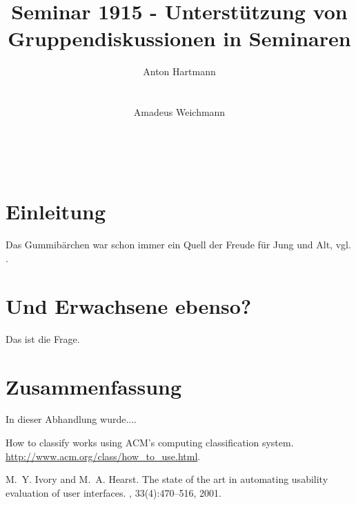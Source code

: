 \documentclass{seminarvorlage}
\begin{document}
\title{Seminar 1915 - Unterstützung von Gruppendiskussionen in Seminaren}
\author{
  \alignauthor Anton Hartmann\\
    \\
    \\
  \alignauthor Amadeus Weichmann\\
    \\
    \\
    \\
}

\maketitle



\section{Einleitung}

Das Gummibärchen war schon immer ein Quell der Freude für Jung
und Alt, vgl. \cite{acmcategories,Ivory2001}.

\section{Und Erwachsene ebenso?}

Das ist die Frage.

\section{Zusammenfassung}
In dieser Abhandlung wurde....


\begin{thebibliography}{9}
How to classify works using ACM's computing classification system.
\newblock \url{http://www.acm.org/class/how_to_use.html}.

M.~Y. Ivory and M.~A. Hearst.
\newblock The state of the art in automating usability evaluation of user
  interfaces.
, 33(4):470--516, 2001.

\end{thebibliography}

%
\end{document}
